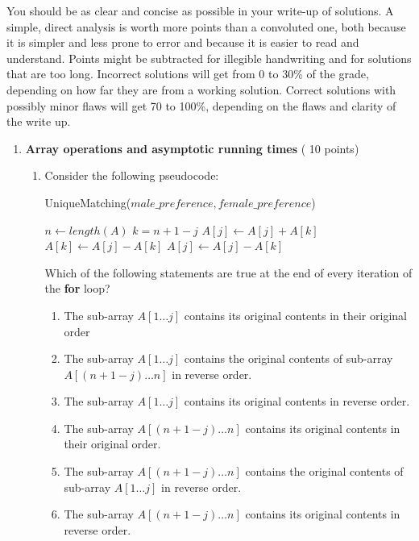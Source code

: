 \documentclass[11pt]{article}
\newcommand{\floor}[1]{\lfloor {#1} \rfloor}
\begin{document}
You should be as clear and concise as possible in your write-up of
solutions. 
A simple, direct analysis is worth more points than a
convoluted one, both because it is simpler and less prone to error and
because it is easier to read and understand. Points might be
subtracted for illegible handwriting and for solutions that are too
long. Incorrect solutions will get from 0 to 30\% of the grade,
depending on how far they are from a working solution. Correct
solutions with possibly minor flaws will get 70 to 100\%, depending on
the flaws and clarity of the write up.


\newpage
\begin{enumerate}

  

\item \textbf{Array operations and asymptotic running times} ( 10 points) 
      \begin{enumerate}
      \item 
   Consider the following pseudocode:

    \begin{algorithm}[H]
      \caption{UniqueMatching($male\_preference, female\_preference$)} 
      $n \gets length(A)$ \;
      \For{$j\gets 1$ to $\floor{\frac n 2}$} 
      {
        $k= n+1-j$\;
        $ A[j] \gets A[j]+A[k]$     \;
        $ A[k] \gets A[j]-A[k] $ \;
        $A[j] \gets A[j]-A[k]$ \;
      }
    \end{algorithm}


Which of the following statements are true at the end of every iteration of the \textbf{for} loop?
\begin{enumerate}
\item The sub-array $A[1\ldots j]$ contains its original contents in
  their original
  order 
\item The sub-array $A[1\ldots j]$ contains the original contents of
  sub-array \\
  $A[(n+1-j)\ldots n]$ in reverse order.
\item The sub-array $A[1\ldots j]$
  contains its original contents in reverse order.
\item The sub-array
  $A[(n+1-j)\ldots n]$ contains its original contents in their original order.

  \item The sub-array $A[(n+1-j)\ldots n]$ contains the original contents of
  sub-array $A[1\ldots j]$ in reverse order.
\item  The sub-array $A[(n+1-j)\ldots n]$
  contains its original contents in reverse order.
\end{enumerate}


\end{enumerate}
\end{enumerate}
\end{document}
